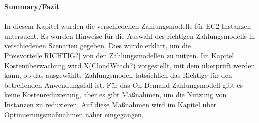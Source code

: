 \textbf{Summary/Fazit}
\\\\
In diesem Kapitel wurden die verschiedenen Zahlungsmodelle für EC2-Instanzen untersucht. Es wurden Hinweise für die Auswahl des richtigen Zahlungsmodells in verschiedenen Szenarien gegeben. Dies wurde erklärt, um die Preisvorteile[RICHTIG?] von den Zahlungsmodellen zu nutzen. 
Im Kapitel Kostenüberwachung wird X(CloudWatch?) vorgestellt, mit dem überprüft werden kann, ob das ausgewählte Zahlungsmodell tatsächlich das Richtige für den betreffenden Anwendungsfall ist. Für das On-Demand-Zahlungsmodell gibt es keine Kostenreduzierung, aber es gibt Maßnahmen, um die Nutzung von Instanzen zu reduzieren. Auf diese Maßnahmen wird im Kapitel über Optimierungsmaßnahmen näher eingegangen.